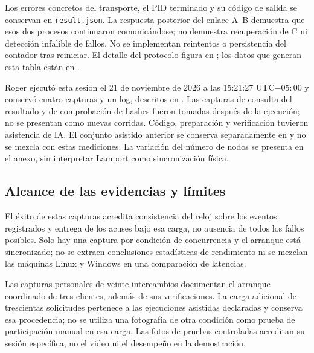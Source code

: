 \begin{table}[htbp]
\centering\small

\caption{Prueba de caída: solicitudes completas, intento fallido y envío huérfano.}
\label{tab:fallo-controlado}
\end{table}

Los errores concretos del transporte, el PID terminado y su código de salida se
conservan en \texttt{result.json}. La respuesta posterior del enlace A--B demuestra
que esos dos procesos continuaron comunicándose; no demuestra recuperación de C
ni detección infalible de fallos. No se implementan reintentos o persistencia del
contador tras reiniciar. El detalle del protocolo figura en
; los datos que generan esta tabla están en
.

Roger ejecutó esta sesión el 21 de noviembre de 2026 a las 15:21:27 UTC$-05{:}00$
y conservó cuatro capturas y un log, descritos en .
Las capturas de consulta del resultado y de comprobación de hashes fueron tomadas
después de la ejecución; no se presentan como nuevas corridas. Código, preparación
y verificación tuvieron asistencia de IA. El conjunto asistido anterior se conserva
separadamente en  y no se mezcla con estas mediciones.
La variación del número de nodos se presenta en el anexo, sin interpretar Lamport
como sincronización física.

\subsection{Alcance de las evidencias y límites}
El éxito de estas capturas acredita consistencia del reloj sobre los eventos
registrados y entrega de los acuses bajo esa carga, no ausencia de todos los
fallos posibles. Solo hay una captura por condición de concurrencia y el arranque
está sincronizado; no se extraen conclusiones estadísticas de rendimiento ni
se mezclan las máquinas Linux y Windows en una comparación de latencias.

Las capturas personales de veinte intercambios documentan el arranque coordinado
de tres clientes, además de sus verificaciones. La carga adicional de trescientas
solicitudes pertenece a las ejecuciones asistidas declaradas y conserva esa
procedencia; no se utiliza una fotografía de otra condición como prueba de
participación manual en esa carga. Las fotos de pruebas controladas acreditan
su sesión específica, no el video ni el desempeño en la demostración.


